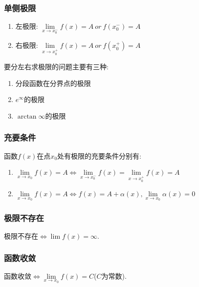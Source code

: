 \subsubsection{单侧极限}
\begin{enumerate}
    \item 左极限: $ \lim\limits_{x\rightarrow x_{0}^{-}}f(x)=A\ or\ f(x_{0}^{-})=A $
    \item 右极限: $ \lim\limits_{x\rightarrow x_{0}^{+}}f(x)=A\ or\ f(x_{0}^{+})=A $
\end{enumerate}
\begin{tcolorbox}
    要分左右求极限的问题主要有三种:
    \begin{enumerate}
        \item 分段函数在分界点的极限
        \item $ e^{\infty} $的极限
        \item $ \arctan \infty $的极限
    \end{enumerate}
\end{tcolorbox}
\subsubsection{充要条件}
函数$ f(x) $在点$ x_{0} $处有极限的充要条件分别有:
\begin{enumerate}
    \item $ \lim\limits_{x\rightarrow x_{0}}f(x)=A\Leftrightarrow \lim\limits_{x\rightarrow x_{0}^{-}}f(x)=\lim\limits_{x\rightarrow x_{0}^{+}}f(x)=A $
    \item $ \lim\limits_{x\rightarrow x_{0}}f(x)=A\Leftrightarrow f(x)=A+\alpha(x), \lim\limits_{x\rightarrow x_{0}}\alpha(x)=0 $
\end{enumerate}
\subsubsection{极限不存在}
极限不存在$ \Leftrightarrow \lim\limits f(x)=\infty $.
\subsubsection{函数收敛}
函数收敛$ \Leftrightarrow \lim\limits_{x \rightarrow x_{0}}f(x)=C $($ C $为常数).

